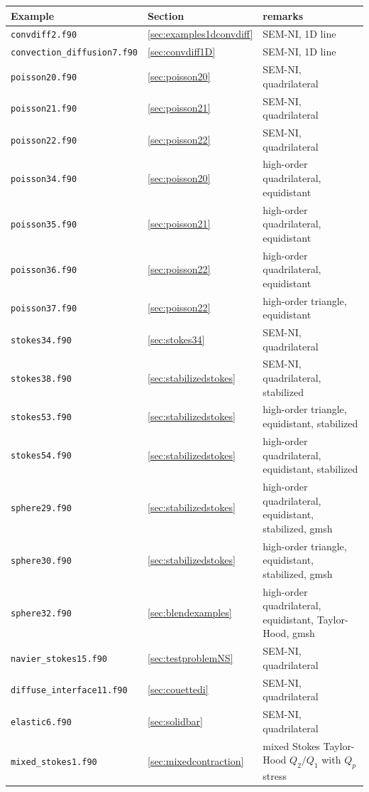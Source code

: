 \begin{tabular}{lll}
Example & Section & remarks \\\hline
 \texttt{convdiff2.f90} & \ref{sec:examples1dconvdiff} & SEM-NI, 1D line \\
 \texttt{convection\_diffusion7.f90} & \ref{sec:convdiff1D} & SEM-NI, 1D line \\
 \texttt{poisson20.f90} & \ref{sec:poisson20} & SEM-NI, quadrilateral\\
 \texttt{poisson21.f90} & \ref{sec:poisson21} & SEM-NI, quadrilateral\\
 \texttt{poisson22.f90} & \ref{sec:poisson22} & SEM-NI, quadrilateral\\
 \texttt{poisson34.f90} & \ref{sec:poisson20} & high-order quadrilateral, equidistant\\
 \texttt{poisson35.f90} & \ref{sec:poisson21} & high-order quadrilateral, equidistant\\
 \texttt{poisson36.f90} & \ref{sec:poisson22} & high-order quadrilateral, equidistant\\
 \texttt{poisson37.f90} & \ref{sec:poisson22} & high-order triangle, equidistant\\
 \texttt{stokes34.f90} & \ref{sec:stokes34} & SEM-NI, quadrilateral\\
 \texttt{stokes38.f90} & \ref{sec:stabilizedstokes} & SEM-NI, quadrilateral, stabilized\\
 \texttt{stokes53.f90} & \ref{sec:stabilizedstokes} & high-order triangle, equidistant, stabilized\\
 \texttt{stokes54.f90} & \ref{sec:stabilizedstokes} & high-order quadrilateral, equidistant, stabilized\\
 \texttt{sphere29.f90} & \ref{sec:stabilizedstokes} & high-order quadrilateral, equidistant, stabilized, gmsh\\
 \texttt{sphere30.f90} & \ref{sec:stabilizedstokes} & high-order triangle, equidistant, stabilized, gmsh\\
 \texttt{sphere32.f90} & \ref{sec:blendexamples} & high-order quadrilateral, equidistant, Taylor-Hood, gmsh\\
 \texttt{navier\_stokes15.f90} & \ref{sec:testproblemNS} & SEM-NI, quadrilateral\\
 \texttt{diffuse\_interface11.f90} & \ref{sec:couettedi} & SEM-NI, quadrilateral\\
 \texttt{elastic6.f90} & \ref{sec:solidbar} & SEM-NI, quadrilateral\\
  \texttt{mixed\_stokes1.f90} & \ref{sec:mixedcontraction} & mixed Stokes Taylor-Hood $Q_2/Q_1$ with $Q_p$ stress \\
\end{tabular}

